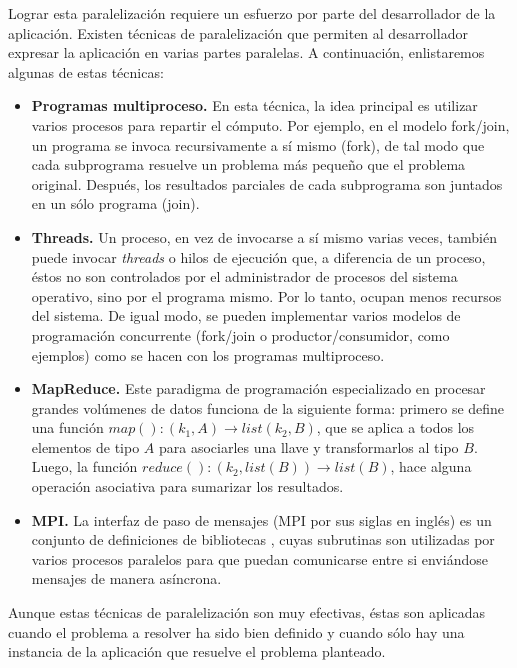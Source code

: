 Lograr esta paralelización requiere un esfuerzo por parte del desarrollador de la aplicación. Existen técnicas de paralelización que permiten al desarrollador expresar la aplicación en varias partes paralelas. A continuación, enlistaremos algunas de estas técnicas:

\begin{itemize}
\item{\textbf{Programas multiproceso.} En esta técnica, la idea principal es utilizar varios procesos para repartir el cómputo. Por ejemplo, en el modelo fork/join, un programa se invoca recursivamente a sí mismo (fork), de tal modo que cada subprograma resuelve un problema más pequeño que el problema original. Después, los resultados parciales de cada subprograma son juntados en un sólo programa (join).}

\item{\textbf{Threads.} Un proceso, en vez de invocarse a sí mismo varias veces, también puede invocar \emph{threads} o hilos de ejecución que, a diferencia de un proceso, éstos no son controlados por el administrador de procesos del sistema operativo, sino por el programa mismo. Por lo tanto, ocupan menos recursos del sistema. De igual modo, se pueden implementar varios modelos de programación concurrente (fork/join o productor/consumidor, como ejemplos) como se hacen con los programas multiproceso.}

\item{\textbf{MapReduce.} Este paradigma de programación especializado en procesar grandes volúmenes de datos \cite{dean2008mapreduce} funciona de la siguiente forma: primero se define una función $map(): (k_1,A) \rightarrow list(k_2,B)$, que se aplica a todos los elementos de tipo $A$ para asociarles una llave y transformarlos al tipo $B$. Luego, la función $reduce(): (k_2, list(B)) \rightarrow list(B)$, hace alguna operación asociativa para sumarizar los resultados.}

\item{\textbf{MPI.} La interfaz de paso de mensajes (MPI por sus siglas en inglés) es un conjunto de definiciones de bibliotecas \cite{lusk2009mpi}, cuyas subrutinas son utilizadas por varios procesos paralelos para que puedan comunicarse entre si enviándose mensajes de manera asíncrona.}
\end{itemize}

Aunque estas técnicas de paralelización son muy efectivas, éstas son aplicadas cuando el problema a resolver ha sido bien definido y cuando sólo hay una instancia de la aplicación que resuelve el problema planteado. 

